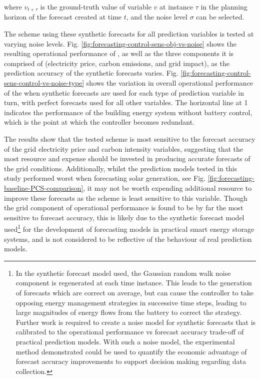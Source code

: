 where $v_{t+\tau}$ is the ground-truth value of variable $v$ at instance $\tau$ in the planning horizon of the forecast created at time $t$, and the noise level $\sigma$ can be selected.

The  scheme using these synthetic forecasts for all prediction variables is tested at varying noise levels. Fig. \ref{fig:forecasting-control-sens-obj-vs-noise} shows the resulting operational performance of , as well as the three components it is comprised of (electricity price, carbon emissions, and grid impact), as the prediction accuracy of the synthetic forecasts varies. Fig. \ref{fig:forecasting-control-sens-control-vs-noise-type} shows the variation in overall operational performance of the  when synthetic forecasts are used for each type of prediction variable in turn, with perfect forecasts used for all other variables. The horizontal line at 1 indicates the performance of the building energy system without battery control, which is the point at which the  controller becomes redundant.

The results show that the tested  scheme is most sensitive to the forecast accuracy of the grid electricity price and carbon intensity variables, suggesting that the most resource and expense should be invested in producing accurate forecasts of the grid conditions. Additionally, whilst the prediction models tested in this study performed worst when forecasting solar generation, see Fig. \ref{fig:forecasting-baseline-PCS-comparison}, it may not be worth expending additional resource to improve these forecasts as the  scheme is least sensitive to this variable. Though the grid component of operational performance is found to be by far the most sensitive to forecast accuracy, this is likely due to the synthetic forecast model used\footnote{In the synthetic forecast model used, the Gaussian random walk noise component is regenerated at each time instance. This leads to the generation of forecasts which are correct on average, but can cause the  controller to take opposing energy management strategies in successive time steps, leading to large magnitudes of energy flows from the battery to correct the strategy. Further work is required to create a noise model for synthetic forecasts that is calibrated to the operational performance vs forecast accuracy trade-off of practical prediction models. With such a noise model, the experimental method demonstrated could be used to quantify the economic advantage of forecast accuracy improvements to support decision making regarding data collection.} for the development of forecasting models in practical smart energy storage systems, and is not considered to be reflective of the behaviour of real prediction models.

